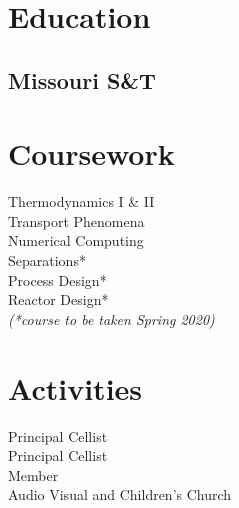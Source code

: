 \documentclass[]{deedy-resume-openfont}
\begin{document}
%
%
\lastupdated

%
%



%
%

\begin{minipage}[t]{0.33\textwidth} 


\section{Education} 
\sectionsep
\subsection{Missouri S\&T}

\sectionsep


\section{Coursework}
\sectionsep
Thermodynamics I \& II \\
Transport Phenomena \\
Numerical Computing \\
Separations* \\
Process Design* \\
Reactor Design* \\
{\footnotesize \textit{{(*course to be taken Spring 2020) }}} \\
\sectionsep


\section{Activities}
\sectionsep
{}
Principal Cellist \\
\sectionsep
{} 
Principal Cellist \\
\sectionsep
{}
Member \\
\sectionsep
{}
Audio Visual and Children's Church
\sectionsep

%
%

\end{minipage} 
\end{document}
